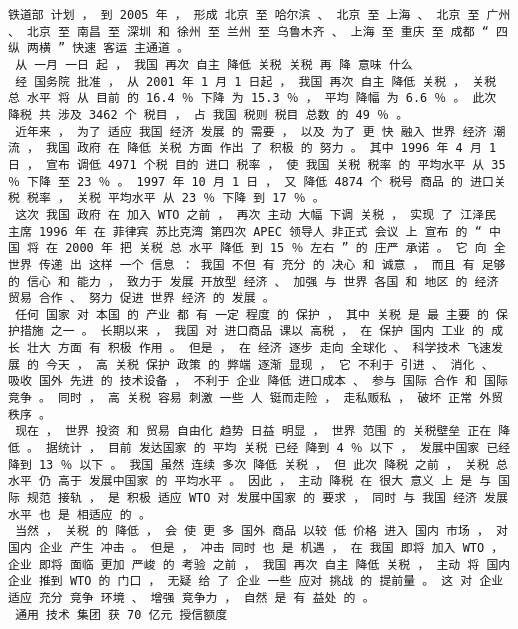 \documentclass{article}
\begin{document}
\begin{Verbatim}[commandchars=\\\{\}]
 铁道部 计划 ， 到 2005 年 ， 形成 北京 至 哈尔滨 、 北京 至 上海 、 北京 至 广州 、 北京 至 南昌 至 深圳 和 徐州 至 兰州 至 乌鲁木齐 、 上海 至 重庆 至 成都 “ 四纵 两横 ” 快速 客运 主通道 。 
 从 一月 一日 起 ， 我国 再次 自主 降低 关税 关税 再 降 意味 什么 
 经 国务院 批准 ， 从 2001 年 1 月 1 日起 ， 我国 再次 自主 降低 关税 ， 关税 总 水平 将 从 目前 的 16.4 ％ 下降 为 15.3 ％ ， 平均 降幅 为 6.6 ％ 。 此次 降税 共 涉及 3462 个 税目 ， 占 我国 税则 税目 总数 的 49 ％ 。 
 近年来 ， 为了 适应 我国 经济 发展 的 需要 ， 以及 为了 更 快 融入 世界 经济 潮流 ， 我国 政府 在 降低 关税 方面 作出 了 积极 的 努力 。 其中 1996 年 4 月 1 日 ， 宣布 调低 4971 个税 目的 进口 税率 ， 使 我国 关税 税率 的 平均水平 从 35 ％ 下降 至 23 ％ 。 1997 年 10 月 1 日 ， 又 降低 4874 个 税号 商品 的 进口关税 税率 ， 关税 平均水平 从 23 ％ 下降 到 17 ％ 。 
 这次 我国 政府 在 加入 WTO 之前 ， 再次 主动 大幅 下调 关税 ， 实现 了 江泽民 主席 1996 年 在 菲律宾 苏比克湾 第四次 APEC 领导人 非正式 会议 上 宣布 的 “ 中国 将 在 2000 年 把 关税 总 水平 降低 到 15 ％ 左右 ” 的 庄严 承诺 。 它 向 全世界 传递 出 这样 一个 信息 ： 我国 不但 有 充分 的 决心 和 诚意 ， 而且 有 足够 的 信心 和 能力 ， 致力于 发展 开放型 经济 、 加强 与 世界 各国 和 地区 的 经济 贸易 合作 、 努力 促进 世界 经济 的 发展 。 
 任何 国家 对 本国 的 产业 都 有 一定 程度 的 保护 ， 其中 关税 是 最 主要 的 保护措施 之一 。 长期以来 ， 我国 对 进口商品 课以 高税 ， 在 保护 国内 工业 的 成长 壮大 方面 有 积极 作用 。 但是 ， 在 经济 逐步 走向 全球化 、 科学技术 飞速发展 的 今天 ， 高 关税 保护 政策 的 弊端 逐渐 显现 ， 它 不利于 引进 、 消化 、 吸收 国外 先进 的 技术设备 ， 不利于 企业 降低 进口成本 、 参与 国际 合作 和 国际竞争 。 同时 ， 高 关税 容易 刺激 一些 人 铤而走险 ， 走私贩私 ， 破坏 正常 外贸 秩序 。 
 现在 ， 世界 投资 和 贸易 自由化 趋势 日益 明显 ， 世界 范围 的 关税壁垒 正在 降低 。 据统计 ， 目前 发达国家 的 平均 关税 已经 降到 4 ％ 以下 ， 发展中国家 已经 降到 13 ％ 以下 。 我国 虽然 连续 多次 降低 关税 ， 但 此次 降税 之前 ， 关税 总 水平 仍 高于 发展中国家 的 平均水平 。 因此 ， 主动 降税 在 很大 意义 上 是 与 国际 规范 接轨 ， 是 积极 适应 WTO 对 发展中国家 的 要求 ， 同时 与 我国 经济 发展 水平 也 是 相适应 的 。 
 当然 ， 关税 的 降低 ， 会 使 更 多 国外 商品 以较 低 价格 进入 国内 市场 ， 对 国内 企业 产生 冲击 。 但是 ， 冲击 同时 也 是 机遇 ， 在 我国 即将 加入 WTO ， 企业 即将 面临 更加 严峻 的 考验 之前 ， 我国 再次 自主 降低 关税 ， 主动 将 国内 企业 推到 WTO 的 门口 ， 无疑 给 了 企业 一些 应对 挑战 的 提前量 。 这 对 企业 适应 充分 竞争 环境 、 增强 竞争力 ， 自然 是 有 益处 的 。 
 通用 技术 集团 获 70 亿元 授信额度 

\end{Verbatim}
\end{document}
